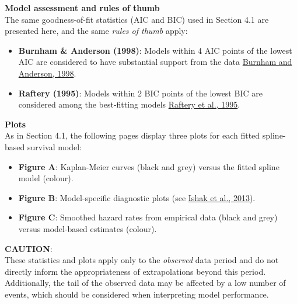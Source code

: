 \documentclass[
]{article}
\providecommand{\tightlist}{%
  \setlength{\itemsep}{0pt}\setlength{\parskip}{0pt}}
\begin{document}
\textbf{Model assessment and rules of thumb}\\
The same goodness-of-fit statistics (AIC and BIC) used in Section 4.1
are presented here, and the same \emph{rules of thumb} apply:

\begin{itemize}
\tightlist
\item
  \textbf{Burnham \& Anderson (1998)}: Models within 4 AIC points of the
  lowest AIC are considered to have substantial support from the data
  \href{https://doi.org/10.1007/978-1-4757-2917-7}{Burnham and Anderson,
  1998}.\\
\item
  \textbf{Raftery (1995)}: Models within 2 BIC points of the lowest BIC
  are considered among the best-fitting models
  \href{https://doi.org/10.2307/271063}{Raftery et al., 1995}.
\end{itemize}

\textbf{Plots}\\
As in Section 4.1, the following pages display three plots for each
fitted spline-based survival model:

\begin{itemize}
\tightlist
\item
  \textbf{Figure A}: Kaplan-Meier curves (black and grey) versus the
  fitted spline model (colour).\\
\item
  \textbf{Figure B}: Model-specific diagnostic plots (see
  \href{https://doi.org/10.1007/s40273-013-0064-3}{Ishak et al.,
  2013}).\\
\item
  \textbf{Figure C}: Smoothed hazard rates from empirical data (black
  and grey) versus model-based estimates (colour).
\end{itemize}

\textbf{CAUTION}:\\
These statistics and plots apply only to the \emph{observed} data period
and do not directly inform the appropriateness of extrapolations beyond
this period.\\
Additionally, the tail of the observed data may be affected by a low
number of events, which should be considered when interpreting model
performance.

\clearpage
\end{document}
